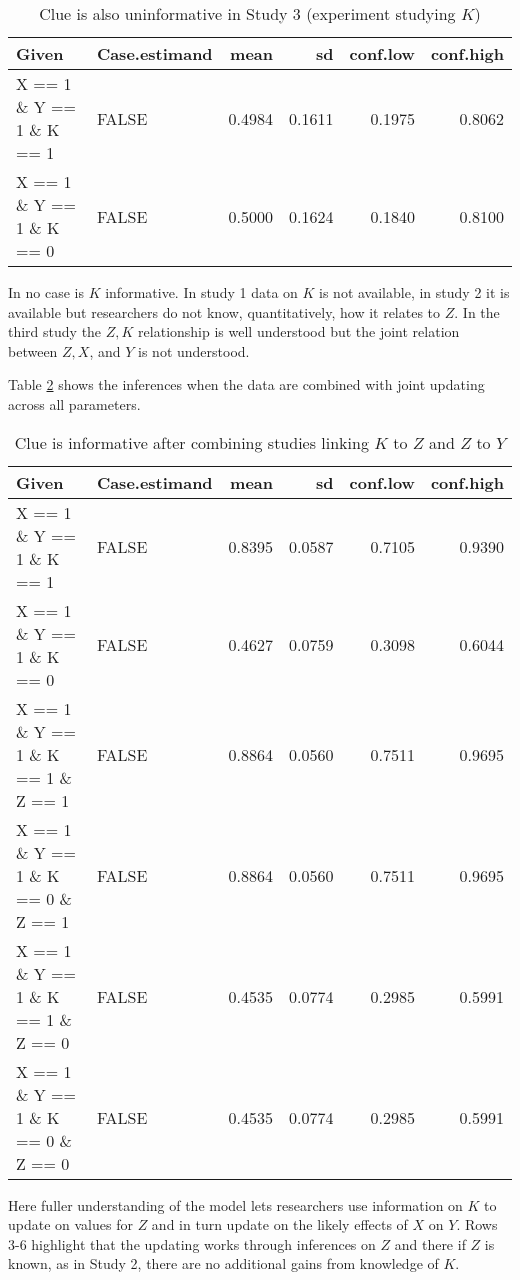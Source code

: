 \documentclass[
  12pt,
]{book}
\begin{document}
\begin{table}

\caption{\label{tab:frank3}Clue is also uninformative in Study 3 (experiment studying $K$)}
\centering
\begin{tabular}[t]{l|l|r|r|r|r}
\hline
Given & Case.estimand & mean & sd & conf.low & conf.high\\
\hline
X == 1 \& Y == 1 \& K == 1 & FALSE & 0.4984 & 0.1611 & 0.1975 & 0.8062\\
\hline
X == 1 \& Y == 1 \& K == 0 & FALSE & 0.5000 & 0.1624 & 0.1840 & 0.8100\\
\hline
\end{tabular}
\end{table}

In no case is \(K\) informative. In study 1 data on \(K\) is not available, in study 2 it is available but researchers do not know, quantitatively, how it relates to \(Z\). In the third study the \(Z,K\) relationship is well understood but the joint relation between \(Z,X\), and \(Y\) is not understood.

Table \ref{tab:frank4} shows the inferences when the data are combined with joint updating across all parameters.

\begin{table}

\caption{\label{tab:frank4}Clue is informative after combining studies linking $K$ to $Z$ and $Z$ to $Y$}
\centering
\begin{tabular}[t]{l|l|r|r|r|r}
\hline
Given & Case.estimand & mean & sd & conf.low & conf.high\\
\hline
X == 1 \& Y == 1 \& K == 1 & FALSE & 0.8395 & 0.0587 & 0.7105 & 0.9390\\
\hline
X == 1 \& Y == 1 \& K == 0 & FALSE & 0.4627 & 0.0759 & 0.3098 & 0.6044\\
\hline
X == 1 \& Y == 1 \& K == 1 \& Z == 1 & FALSE & 0.8864 & 0.0560 & 0.7511 & 0.9695\\
\hline
X == 1 \& Y == 1 \& K == 0 \& Z == 1 & FALSE & 0.8864 & 0.0560 & 0.7511 & 0.9695\\
\hline
X == 1 \& Y == 1 \& K == 1 \& Z == 0 & FALSE & 0.4535 & 0.0774 & 0.2985 & 0.5991\\
\hline
X == 1 \& Y == 1 \& K == 0 \& Z == 0 & FALSE & 0.4535 & 0.0774 & 0.2985 & 0.5991\\
\hline
\end{tabular}
\end{table}

Here fuller understanding of the model lets researchers use information on \(K\) to update on values for \(Z\) and in turn update on the likely effects of \(X\) on \(Y\). Rows 3-6 highlight that the updating works through inferences on \(Z\) and there if \(Z\) is known, as in Study 2, there are no additional gains from knowledge of \(K\).
\end{document}
